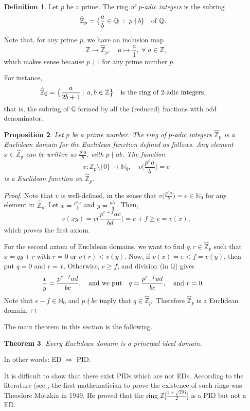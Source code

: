 \documentclass[12pt]{article}
\newcommand{\qbox}[1]{\quad\hbox{#1}\quad}
\def\dst{\displaystyle}
\newtheorem{thm}{Theorem}[section]
\newtheorem{prop}[thm]{Proposition}
\theoremstyle{definition}
\newtheorem{defn}[thm]{Definition}
\newcounter{ex}\renewcommand\theex{\arabic{ex}}
\newcommand{\N}{\ensuremath{\mathbb{N}}}
\newcommand{\Z}{\ensuremath{\mathbb{Z}}}
\newcommand{\Q}{\ensuremath{\mathbb{Q}}}
\def\ii{\mathrm i}
\def\Zp{\widehat{\Z}_p}
\newcommand{\wh}[1]{\widehat{#1}}
\begin{document}
\begin{defn}\label{def:padics}
Let $p$ be a prime. The ring of {\em $p$-adic integers} is the subring
$$\Zp=\{\frac ab\in\Q~:~p\nmid b\}\qbox{of $\Q$.}$$
\end{defn}
Note that, for any prime $p$, we have an inclusion map
$$\Z\longrightarrow\Zp,\quad a\longmapsto\frac a1,\;\forall\;a\in\Z,$$
which makes sense because $p\nmid1$ for any prime number $p$.

For instance,
$$\wh{\Z}_2=\big\{\frac a{2b+1}~|~a,b\in\Z\big\}
\qbox{is the ring of $2$-adic integers,}$$
that is, the subring of $\Q$ formed by all the (reduced) fractions
with odd denominator.



\begin{prop}\label{prop:padics-ed}
Let $p$ be a prime number. The ring of $p$-adic integers $\Zp$ is a
Euclidean domain for the Euclidean function defined as follows.
Any element $x\in\Zp$ can be written as $\dst\frac{p^ea}b$, with
$p\nmid ab$. The function
$$v:\Z_p\setminus\{0\}\to\N_0,\quad v\big(\frac{p^ea}b\big)=e$$
is a Euclidean function on $\Zp$.
\end{prop}


\begin{proof}
Note that $v$ is well-defined, in the sense that 
$\dst v\big(\frac{p^ea}b\big)=e\in\N_0$ for any element in $\Zp$.
Let $\dst x=\frac{p^ea}b$ and $\dst y=\frac{p^fc}d$. Then, 
$$v(xy)=v\big(\frac{p^{e+f}ac}{bd}\big)=e+f\geq e=v(x),$$
which proves the first axiom.

For the second axiom of Euclidean
domains, we want to find $q,r\in\Zp$ such that $x=qy+r$ with $r=0$ or
$v(r)<v(y)$. 
Now, if $v(x)=e<f=v(y)$, then put $q=0$ and $r=x$.
Otherwise, $e\geq f$, and division (in $\Q$) gives
$$\frac xy=\frac{p^{e-f}ad}{bc},
\qbox{and we put}q=\frac{p^{e-f}ad}{bc},
\qbox{and $r=0$.}$$
Note that $e-f\in\N_0$ and $p\nmid bc$ imply that $q\in\Zp$.
Therefore $\Zp$ is a Euclidean domain.
\end{proof}

The main theorem in this section is the following.

\begin{thm}\label{thm:ed-pid}
Every Euclidean domain is a principal ideal domain.
\end{thm}
In other words: ED $\Longrightarrow$ PID.

It is difficult to show that there exist PIDs which are not
EDs. According to the literature (see \cite[Example 3.62]{rot}, the
first mathematician to prove the existence of such rings was Theodore
Motzkin in 1949. He proved that the ring
$\dst\Z\big[\frac{1+\sqrt{19}\ii}2\big]$ is a PID but not a
ED.
\end{document}

